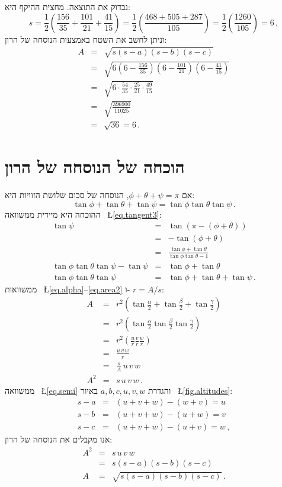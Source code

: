 \documentclass[12pt,a4paper]{article}
\begin{document}
נבדוק את התוצאה. מחצית ההיקף היא:
\[
s=\frac{1}{2}\left(\frac{156}{35} + \frac{101}{21}+\frac{41}{15}\right) = \frac{1}{2}\left(\frac{468+505+287}{105}\right) = \frac{1}{2}\left(\frac{1260}{105}\right)= 6\,,
\]
וניתן לחשב את השטח באמצעות הנוסחה של הרון:
\begin{eqnarray*}
A &=& \sqrt{s(s-a)(s-b)(s-c)}\\
&=& \sqrt{6 \left(6-\frac{156}{35}\right) \left(6-\frac{101}{21}\right) \left(6-\frac{41}{15}\right)}\\
&=& \sqrt{6 \cdot \frac{54}{35}\cdot \frac{25}{21} \cdot \frac{49}{15}}\\
&=& \sqrt{\frac{396900}{11025}}\\
&=& \sqrt{36} = 6\,.
\end{eqnarray*}

\section{הוכחה של הנוסחה של הרון}

אם
$\phi+\theta+\psi=\pi$,
הנוסחה של סכום שלושת הזוויות היא:
\begin{equation}
\tan\phi+\tan\theta+\tan\psi = \tan\phi\tan\theta\tan\psi\,. \label{eq.triple}
\end{equation}
ההוכחה היא מיידית ממשוואה
~\L{\ref{eq.tangent3}}:
\begin{eqnarray*}
\tan\psi &=& \tan (\pi-(\phi+\theta))\\
&=& -\tan (\phi+\theta)\\
&=& \frac{\tan\phi+\tan\theta}{\tan\phi\tan\theta-1}\\
\tan\phi\tan\theta\tan\psi-\tan\psi&=& \tan\phi+\tan\theta\\
\tan\phi\tan\theta\tan\psi &=&\tan\phi+\tan\theta+\tan\psi\,.
\end{eqnarray*}
ממשוואות 
~\L{\ref{eq.alpha}--\ref{eq.area2}}
ו-%
$r=A/s$:
\begin{eqnarray*}
A &=& r^2\left(\tan \frac{\alpha}{2}+\tan \frac{\beta}{2}+\tan \frac{\gamma}{2}\right)\\
&=&r^2\left(\tan \frac{\alpha}{2}\tan \frac{\beta}{2}\tan \frac{\gamma}{2}\right)\\
&=&r^2\left(\frac{u}{r}\frac{v}{r}\frac{w}{r}\right)\\
&=&\frac{u\,v\,w}{r}\\
&=&\frac{s}{A}\,u\,v\,w\\
A^2&=&s\,u\,v\,w\,.
\end{eqnarray*}
ממשוואה
~\L{\ref{eq.semi}}
והגדרת
$a,b,c,u,v,w$
באיור%
~\L{\ref{fig.altitudes}}:
\begin{eqnarray*}
s - a &=& (u+v+w) - (w+v) = u\\
s - b &=& (u+v+w) - (u+w) = v\\
s - c &=& (u+v+w) - (u+v) = w\,,
\end{eqnarray*}
אנו מקבלים את הנוסחה של הרון:
\begin{eqnarray*}
A^2 &=& s\,u\,v\,w\\
&=& s(s-a)(s-b)(s-c)\\
A &=& \sqrt{s(s-a)(s-b)(s-c)}\,.
\end{eqnarray*}
\end{document}

